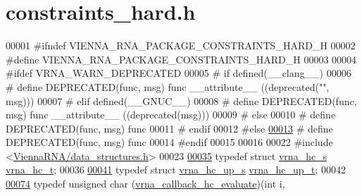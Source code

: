 \hypertarget{constraints__hard_8h_source}{}\section{constraints\+\_\+hard.\+h}
\label{constraints__hard_8h_source}

\begin{DoxyCode}
00001 \textcolor{preprocessor}{#ifndef VIENNA\_RNA\_PACKAGE\_CONSTRAINTS\_HARD\_H}
00002 \textcolor{preprocessor}{#define VIENNA\_RNA\_PACKAGE\_CONSTRAINTS\_HARD\_H}
00003 
00004 \textcolor{preprocessor}{#ifdef VRNA\_WARN\_DEPRECATED}
00005 \textcolor{preprocessor}{# if defined(\_\_clang\_\_)}
00006 \textcolor{preprocessor}{#  define DEPRECATED(func, msg) func \_\_attribute\_\_ ((deprecated("", msg)))}
00007 \textcolor{preprocessor}{# elif defined(\_\_GNUC\_\_)}
00008 \textcolor{preprocessor}{#  define DEPRECATED(func, msg) func \_\_attribute\_\_ ((deprecated(msg)))}
00009 \textcolor{preprocessor}{# else}
00010 \textcolor{preprocessor}{#  define DEPRECATED(func, msg) func}
00011 \textcolor{preprocessor}{# endif}
00012 \textcolor{preprocessor}{#else}
\mbox{\hyperlink{constraints__hard_8h_aab347a3c03fbe8e7319551b9fa0cce4a}{00013}} \textcolor{preprocessor}{# define DEPRECATED(func, msg) func}
00014 \textcolor{preprocessor}{#endif}
00015 
00016 
00022 \textcolor{preprocessor}{#include <\mbox{\hyperlink{data__structures_8h}{ViennaRNA/data\_structures.h}}>}
00023 
\mbox{\hyperlink{group__hard__constraints_gac7e4c4f8abe3163a68110c5bff24e01d}{00035}} \textcolor{keyword}{typedef} \textcolor{keyword}{struct  }\mbox{\hyperlink{group__hard__constraints_structvrna__hc__s}{vrna\_hc\_s}} \mbox{\hyperlink{group__hard__constraints_structvrna__hc__s}{vrna\_hc\_t}};
00036 
\mbox{\hyperlink{group__hard__constraints_ga8cd53427a942a81c87ec526bbff32ef9}{00041}} \textcolor{keyword}{typedef} \textcolor{keyword}{struct }\mbox{\hyperlink{group__hard__constraints_structvrna__hc__up__s}{vrna\_hc\_up\_s}} \mbox{\hyperlink{group__hard__constraints_structvrna__hc__up__s}{vrna\_hc\_up\_t}};
00042 
\mbox{\hyperlink{group__hard__constraints_gae465f1d4a3d8b6592b38ecbb0d9f613d}{00074}} \textcolor{keyword}{typedef} \textcolor{keywordtype}{unsigned} char (\mbox{\hyperlink{group__hard__constraints_gae465f1d4a3d8b6592b38ecbb0d9f613d}{vrna\_callback\_hc\_evaluate}})(\textcolor{keywordtype}{int}           i,

\end{DoxyCode}
